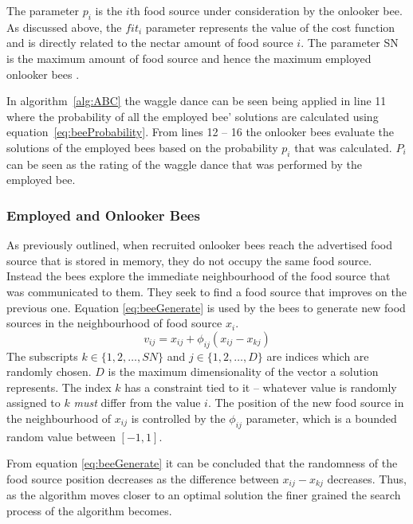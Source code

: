 The parameter $p_i$ is the $i$th food source under consideration by the onlooker bee. As discussed above, the ${fit}_i$ parameter represents the value of the cost function and is directly related to the nectar amount of food source $i$. The parameter SN is the maximum amount of food source and hence the maximum employed onlooker bees \cite{ABCCompareStudy}.

In algorithm~\ref{alg:ABC} the waggle dance can be seen being applied in line 11 where the probability of all the employed bee' solutions are calculated using equation~\ref{eq:beeProbability}. From lines 12 -- 16 the onlooker bees evaluate the solutions of the employed bees based on the probability $p_i$ that was calculated. $P_i$ can be seen as the rating of the waggle dance that was performed by the employed bee.

\subsubsection{Employed and Onlooker Bees}
\label{sec:employonlookerbees}
As previously outlined, when recruited onlooker bees reach the advertised food source that is stored in memory, they do not occupy the same food source\cite{ABCCompareStudy,ABCNumericalOptimization}. Instead the bees explore the immediate neighbourhood of the food source that was communicated to them\cite{BeeJobShop,ABCFusionGrid,ABCReconfigDistro}. They seek to find a food source that improves on the previous one\cite{BeeJobShop,ABCCompareStudy,ABCLeafConstrained,ABCNumericalOptimization}. Equation \ref{eq:beeGenerate} is used by the bees to generate new food sources in the neighbourhood of food source $x_i$\cite{BeeJobShop,ABCCompareStudy,ABCFusionGrid}.
\begin{equation}
\label{eq:beeGenerate}
v_{ij} = x_{ij} + \phi_{ij}(x_{ij} - x_{kj})
\end{equation}
The subscripts $k \in \{1,2,\dots,SN\}$ and $j \in \{1,2,\dots,D\}$ are indices which are randomly chosen. $D$ is the maximum dimensionality of the vector a solution represents. The index $k$ has a constraint tied to it -- whatever value is randomly assigned to $k$ \emph{must} differ from the value $i$. The position of the new food source in the neighbourhood of $x_{ij}$ is controlled by the $\phi_{ij}$ parameter, which is a bounded random value between $[-1,1]$. 

From equation \ref{eq:beeGenerate} it can be concluded that the randomness of the food source position decreases as the difference between $x_{ij} - x_{kj}$ decreases. Thus, as the algorithm moves closer to an optimal solution the finer grained the search process of the algorithm becomes\cite{ABCCompareStudy,ABCNumericalOptimization,ABCImageEnhancement}.

